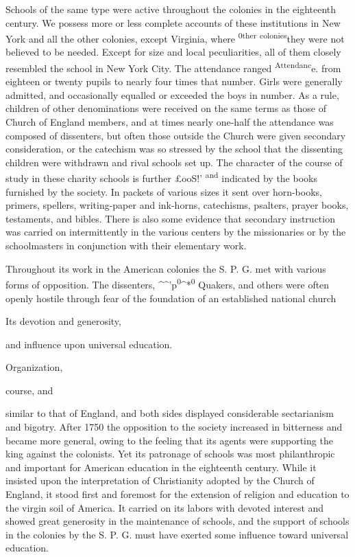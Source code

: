 \documentclass[
]{book}
\begin{document}
Schools of the same type were active throughout the colonies in the eighteenth century. We possess more or less complete accounts of these institutions in New York and all the other colonies, except Virginia, where \textsuperscript{0ther} \textsuperscript{colonies}they were not believed to be needed. Except for size and local peculiarities, all of them closely resembled the school in New York City. The attendance ranged \textsuperscript{Attendanc}e. from eighteen or twenty pupils to nearly four times that number. Girls were generally admitted, and occasionally equalled or exceeded the boys in number. As a rule, children of other denominations were received on the same terms as those of Church of England members, and at times nearly one-half the attendance was composed of dissenters, but often those outside the Church were given secondary consideration, or the catechism was so stressed by the school that the dissenting children were withdrawn and rival schools set up. The character of the course of study in these charity schools is further £ooS!' \textsuperscript{and} indicated by the books furnished by the society. In packets of various sizes it sent over horn-books, primers, spellers, writing-paper and ink-horns, catechisms, psalters, prayer books, testaments, and bibles. There is also some evidence that secondary instruction was carried on intermittently in the various centers by the missionaries or by the schoolmasters in conjunction with their elementary work.

Throughout its work in the American colonies the S. P. G. met with various forms of opposition. The dissenters, \^{}\^{}'p\textsuperscript{0}\^{}*\textsuperscript{0} Quakers, and others were often openly hostile through fear of the foundation of an established national church

Its devotion and generosity,

and influence upon universal education.

Organization,

course, and

similar to that of England, and both sides displayed considerable sectarianism and bigotry. After 1750 the opposition to the society increased in bitterness and became more general, owing to the feeling that its agents were supporting the king against the colonists. Yet its patronage of schools was most philanthropic and important for American education in the eighteenth century. While it insisted upon the interpretation of Christianity adopted by the Church of England, it stood first and foremost for the extension of religion and education to the virgin soil of America. It carried on its labors with devoted interest and showed great generosity in the maintenance of schools, and the support of schools in the colonies by the S. P. G. must have exerted some influence toward universal education.
\end{document}
